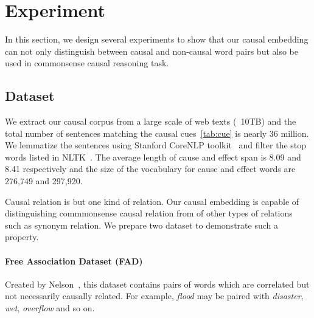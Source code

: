 \section{Experiment}
\label{sec:experiment}
In this section, we design several experiments to show that our causal embedding 
can not only distinguish between causal and non-causal word pairs but also be used 
in commonsense causal reasoning task.

\subsection{Dataset}
We extract our causal corpus from a large scale of web texts (~10TB) 
and the total number of sentences matching the causal cues~\ref{tab:cue} is 
nearly 36 million. We lemmatize the sentences using Stanford CoreNLP 
toolkit~\cite{manning-EtAl:2014:P14-5} and filter the stop words 
listed in NLTK~\cite{bird2009natural}. The average length of cause and effect 
span is 8.09 and 8.41 respectively and the size of the vocabulary for cause and 
effect words are 276,749 and 297,920.

Causal relation is but one kind of relation. Our causal embedding 
is capable of distinguishing commmonsense causal relation 
from of other types of relations such as synonym relation.
We prepare two dataset to demonstrate such a property.

\paragraph{\textbf{F}ree \textbf{A}ssociation \textbf{D}ataset (FAD)} 
Created by Nelson~, 
this dataset contains pairs of words which are correlated but not
necessarily causally related. For example, \emph{flood} may be paired with
\emph{disaster}, \emph{wet}, \emph{overflow} and so on. 

